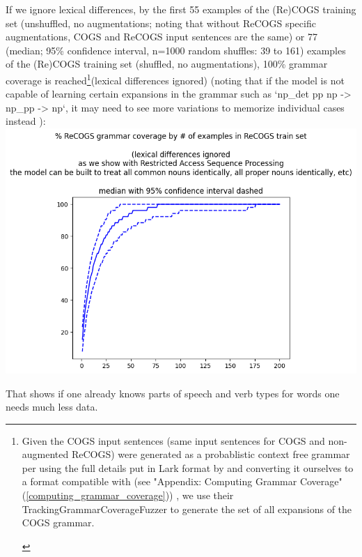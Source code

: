 \documentclass[11pt]{article}
\begin{document}
If we ignore lexical differences, by the first 55 examples of the (Re)COGS training set (unshuffled, no augmentations; noting that without ReCOGS specific augmentations, COGS and ReCOGS input sentences are the same) or 77 (median; 95\% confidence interval, n=1000 random shuffles: 39 to 161) examples of the (Re)COGS training set (shuffled, no augmentations), 100\% grammar coverage is reached\footnote{\begin{footnotesize}Given the COGS input sentences (same input sentences for COGS and non-augmented ReCOGS) were generated as a probablistic context free grammar per \citep{KimLinzen2020}
using the full details put in Lark format by \citep{klinger2024compositionalprogramgenerationfewshot}
and converting it ourselves to a format compatible with \citep{fuzzingbook2023:GrammarCoverageFuzzer} (see "Appendix: Computing Grammar Coverage" (\ref{computing_grammar_coverage})) , we use their TrackingGrammarCoverageFuzzer to generate the set of all expansions of the COGS grammar.
\end{footnotesize}
}(lexical differences ignored) \citep{fuzzingbook2023:GrammarCoverageFuzzer} (noting that if the model is not capable of learning certain expansions in the grammar such as `np\_det pp np -> np\_pp -> np`, it may need to see more variations to memorize individual cases instead ):
\includegraphics[scale=0.38]{grammar_coverage_by_number_of_recogs_training_examples_lexical_differences_ignored.png}

That shows if one already knows parts of speech and verb types for words one needs much less data.
\end{document}
